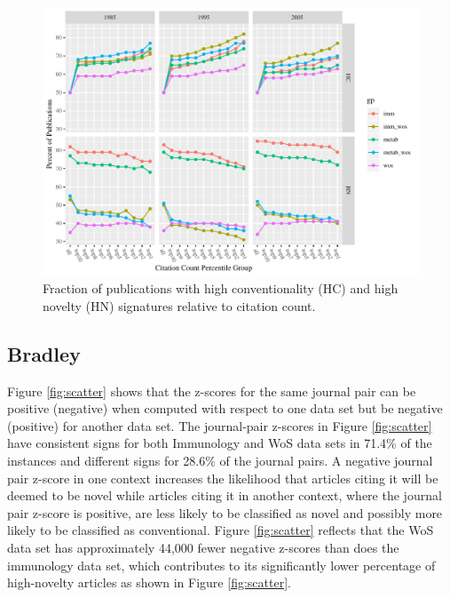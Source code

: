 \documentclass[NETN]{stjour}
\begin{document}
\begin{figure}
\includegraphics[width=\hsize]{Fig1}
\caption{Fraction of publications with high conventionality (HC) and high novelty (HN) signatures relative to citation count.}
\end{figure}


\subsection{Bradley}
Figure \ref{fig:scatter} shows that the z-scores for the same journal pair can be positive (negative) when computed with respect to one data set but be negative (positive) for another data set. The journal-pair z-scores in Figure \ref{fig:scatter} have consistent signs for both Immunology and WoS data sets in 71.4\% of the instances and different signs for 28.6\% of the journal pairs. A negative journal pair z-score in one context increases the likelihood that articles citing it will be deemed to be novel while articles citing it in another context, where the journal pair z-score is positive, are less likely to be classified as novel and possibly more likely to be classified as conventional. Figure \ref{fig:scatter} reflects that the WoS data set has approximately 44,000 fewer negative z-scores than does the immunology data set, which contributes to its significantly lower percentage of high-novelty articles as shown in Figure \ref{fig:scatter}.
\end{document}
